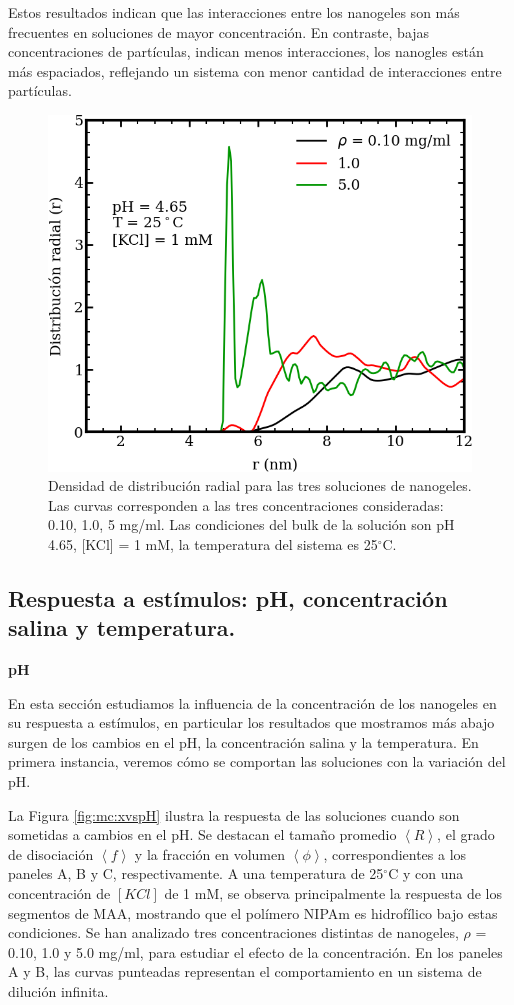 	Estos resultados  indican que las interacciones entre los nanogeles son m\'as frecuentes en soluciones de mayor concentraci\'on. En contraste, bajas concentraciones de part\'iculas, indican menos interacciones, los nanogles est\'an m\'as espaciados, reflejando un sistema con menor cantidad de interacciones entre part\'iculas.
	
	\begin{figure}
		\centering
		\includegraphics[width=0.45\linewidth]{Figures/graph-mc/rdf.png}
		\caption{Densidad de distribuci\'on radial para las tres soluciones de nanogeles. Las curvas corresponden a las tres concentraciones consideradas: 0.10, 1.0, 5 mg/ml. Las condiciones del bulk de la soluci\'on son pH 4.65, [KCl] = 1 mM, la temperatura del sistema es 25$^\circ$C.}
		\label{fig:mc:rdf}
	\end{figure}
	
	
	
	\subsection{Respuesta a est\'imulos: pH, concentraci\'on salina y temperatura.}\label{sec:mc:phs_salt_temp}
	
	\textbf{pH}
	
	En esta secci\'on estudiamos la influencia de la concentraci\'on de los nanogeles en su respuesta a est\'imulos, en particular los resultados que mostramos m\'as abajo surgen de los cambios en el pH, la concentraci\'on salina y la temperatura. En primera instancia, veremos c\'omo se comportan las soluciones con la variaci\'on del pH. %
	
	La Figura \ref{fig:mc:xvspH} ilustra la respuesta de las soluciones cuando son sometidas a cambios en el pH. Se destacan el tama\~no promedio $\left<R\right>$, el grado de disociaci\'on $\left<f\right>$ y la fracci\'on en volumen $\left<\phi\right>$, correspondientes a los paneles A, B y C, respectivamente. A una temperatura de 25$^\circ$C y con una concentraci\'on de $[KCl]$ de 1 mM, se observa principalmente la respuesta de los segmentos de MAA, mostrando que el pol\'imero NIPAm es hidrof\'ilico bajo estas condiciones. Se han analizado tres concentraciones distintas de nanogeles, $\rho$ = 0.10, 1.0 y 5.0 mg/ml, para estudiar el efecto de la concentraci\'on. En los paneles A y B, las curvas punteadas representan el comportamiento en un sistema de diluci\'on infinita.
	
